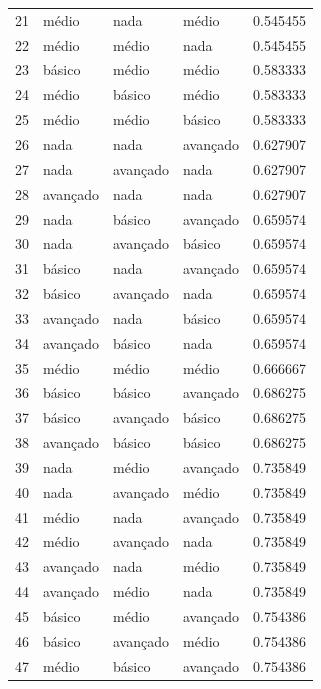 \documentclass[]{article}
\begin{document}
\begin{longtable}{|llll|r|}
		21 & médio    & nada      & médio    & 0.545455     \\
		22 & médio    & médio    & nada      & 0.545455     \\
		23 & básico   & médio    & médio    & 0.583333     \\
		24 & médio    & básico   & médio    & 0.583333     \\
		25 & médio    & médio    & básico   & 0.583333     \\
		26 & nada      & nada      & avançado & 0.627907     \\
		27 & nada      & avançado & nada      & 0.627907     \\
		28 & avançado & nada      & nada      & 0.627907     \\
		29 & nada      & básico   & avançado & 0.659574     \\
		30 & nada      & avançado & básico   & 0.659574     \\
		31 & básico   & nada      & avançado & 0.659574     \\
		32 & básico   & avançado & nada      & 0.659574     \\
		33 & avançado & nada      & básico   & 0.659574     \\
		34 & avançado & básico   & nada      & 0.659574     \\
		35 & médio    & médio    & médio    & 0.666667     \\
		36 & básico   & básico   & avançado & 0.686275     \\
		37 & básico   & avançado & básico   & 0.686275     \\
		38 & avançado & básico   & básico   & 0.686275     \\
		39 & nada      & médio    & avançado & 0.735849     \\
		40 & nada      & avançado & médio    & 0.735849     \\
		41 & médio    & nada      & avançado & 0.735849     \\
		42 & médio    & avançado & nada      & 0.735849     \\
		43 & avançado & nada      & médio    & 0.735849     \\
		44 & avançado & médio    & nada      & 0.735849     \\
		45 & básico   & médio    & avançado & 0.754386     \\
		46 & básico   & avançado & médio    & 0.754386     \\
		47 & médio    & básico   & avançado & 0.754386     \\

\end{longtable}
\end{document}

